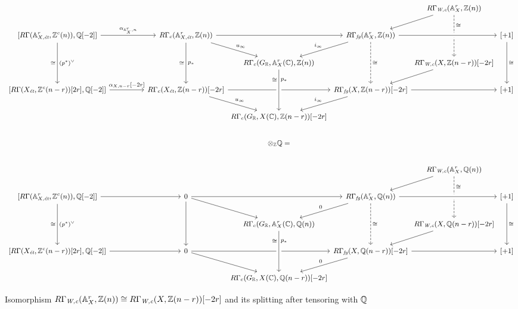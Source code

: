 \documentclass{article}
\numberwithin{equation}{section}
\begin{document}
\begin{landscape}
  \begin{figure}
    \[ \begin{tikzcd}[font=\small]
        &[2em] &[-2.5em] &[-2.5em] &[-2.5em] R\Gamma_\Wc (\AA^r_X, \ZZ (n))\ar{dl}\ar[dashed,near start]{dd}{\cong} &[-2.5em] \\
        {[R\Gamma (\AA^r_{X,\et}, \ZZ^c (n)), \QQ[-2]]} \ar{r}{\alpha_{\AA^r_X,n}}\ar{dd}{(p^*)^\vee}[swap]{\cong} & R\Gamma_c (\AA^r_{X,\et}, \ZZ (n)) \ar{dr}{u_\infty} \ar{dd}{p_*}[swap]{\cong} \ar{rr} & & R\Gamma_\fg (\AA^r_X, \ZZ (n))\ar{dl}[swap]{i_\infty} \ar[dashed]{dd}{\cong} \ar[crossing over]{rr} & & {[+1]} \ar{dd}{\cong} \\
        & & R\Gamma_c (G_\RR, \AA^r_X (\CC), \ZZ (n)) & & R\Gamma_\Wc (X, \ZZ (n-r)) [-2r]\ar{dl} \\
        {[R\Gamma (X_\et, \ZZ^c (n-r)) [2r], \QQ[-2]]} \ar{r}{\alpha_{X,n-r} [-2r]} & R\Gamma_c (X_\et, \ZZ (n-r)) [-2r] \ar{dr}{u_\infty} \ar{rr} & & R\Gamma_\fg (X, \ZZ (n-r)) [-2r] \ar{dl}[swap]{i_\infty} \ar{rr} & & {[+1]} \\
        & & R\Gamma_c (G_\RR, X (\CC), \ZZ (n-r)) [-2r] \ar[<-,near end,crossing over]{uu}[swap]{p_*}{\cong}\\
        & & \otimes_\ZZ \QQ = \\
        & & & & R\Gamma_\Wc (\AA^r_X, \QQ (n))\ar{dl}\ar[dashed,near start]{dd}{\cong} & \\
        {[R\Gamma (\AA^r_{X,\et}, \ZZ^c (n)), \QQ[-2]]} \ar{r}\ar{dd}{(p^*)^\vee}[swap]{\cong} & 0 \ar{dr} \ar{dd} \ar{rr} & & R\Gamma_\fg (\AA^r_X, \QQ (n))\ar{dl}[swap]{0} \ar[dashed]{dd}{\cong} \ar[crossing over]{rr} & & {[+1]} \ar{dd}{\cong} \\
        & & R\Gamma_c (G_\RR, \AA^r_X (\CC), \QQ (n)) & & R\Gamma_\Wc (X, \QQ (n-r)) [-2r]\ar{dl} \\
        {[R\Gamma (X_\et, \ZZ^c (n-r)) [2r], \QQ[-2]]} \ar{r} & 0 \ar{dr} \ar{rr} & & R\Gamma_\fg (X, \QQ (n-r)) [-2r] \ar{dl}[swap]{0} \ar{rr} & & {[+1]} \\
        & & R\Gamma_c (G_\RR, X (\CC), \QQ (n-r)) [-2r] \ar[<-,near end,crossing over]{uu}[swap]{p_*}{\cong}
      \end{tikzcd} \]

    \caption{Isomorphism
      $R\Gamma_{\text{\it W,c}} (\mathbb{A}^r_X, \mathbb{Z} (n)) \cong R\Gamma_{\text{\it W,c}} (X, \mathbb{Z} (n-r)) [-2r]$
      and its splitting after tensoring with $\mathbb{Q}$}
    \label{fig:RGamma-Wc-and-affine-bundles}
  \end{figure}
\end{landscape}
\end{document}
